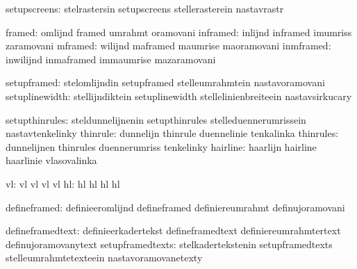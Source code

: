                  setupscreens:  stelrastersin                setupscreens
                                stellerasterein              nastavrastr

                       framed:  omlijnd                      framed
                                umrahmt                      oramovani
                     inframed:  inlijnd                      inframed
                                imumriss                     zaramovani
                      mframed:  wilijnd                      maframed
                                maumrise                     maoramovani
                    inmframed:  inwilijnd                    inmaframed
                                immaumrise                   mazaramovani

                  setupframed:  stelomlijndin                setupframed
                                stelleumrahmtein             nastavoramovani
               setuplinewidth:  stellijndiktein              setuplinewidth
                                stellelinienbreiteein        nastavsirkucary

               setupthinrules:  steldunnelijnenin            setupthinrules
                                stelleduennerumrissein       nastavtenkelinky
                     thinrule:  dunnelijn                    thinrule
                                duennelinie                  tenkalinka
                    thinrules:  dunnelijnen                  thinrules
                                duennerumriss                tenkelinky
                     hairline:  haarlijn                     hairline
                                haarlinie                    vlasovalinka

                           vl:  vl                           vl
                                vl                           vl
                           hl:  hl                           hl
                                hl                           hl

                 defineframed:  definieeromlijnd             defineframed
                                definiereumrahmt             definujoramovani

             defineframedtext:  definieerkadertekst          defineframedtext
                                definiereumrahmtertext       definujoramovanytext
             setupframedtexts:  stelkadertekstenin           setupframedtexts
                                stelleumrahmtetexteein       nastavoramovanetexty

